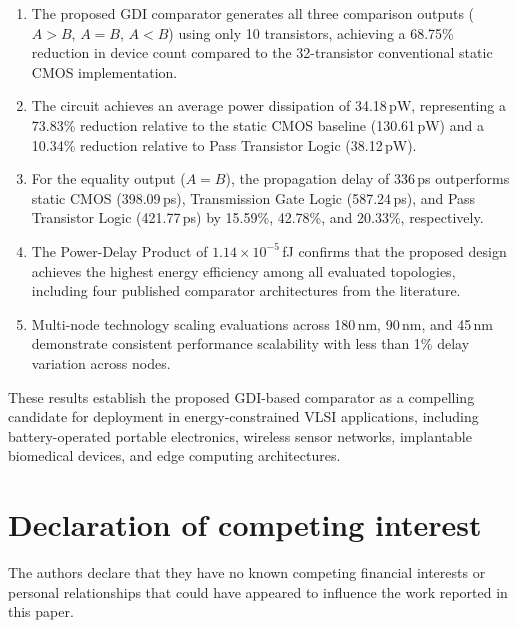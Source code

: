 \documentclass[final,5p,times,twocolumn]{elsarticle}
\begin{document}
\begin{enumerate}
    \item The proposed GDI comparator generates all three comparison outputs ($A>B$, $A=B$, $A<B$) using only 10 transistors, achieving a 68.75\% reduction in device count compared to the 32-transistor conventional static CMOS implementation.
    \item The circuit achieves an average power dissipation of 34.18\,pW, representing a 73.83\% reduction relative to the static CMOS baseline (130.61\,pW) and a 10.34\% reduction relative to Pass Transistor Logic (38.12\,pW).
    \item For the equality output ($A=B$), the propagation delay of 336\,ps outperforms static CMOS (398.09\,ps), Transmission Gate Logic (587.24\,ps), and Pass Transistor Logic (421.77\,ps) by 15.59\%, 42.78\%, and 20.33\%, respectively.
    \item The Power-Delay Product of $1.14 \times 10^{-5}$\,fJ confirms that the proposed design achieves the highest energy efficiency among all evaluated topologies, including four published comparator architectures from the literature.
    \item Multi-node technology scaling evaluations across 180\,nm, 90\,nm, and 45\,nm demonstrate consistent performance scalability with less than 1\% delay variation across nodes.
\end{enumerate}

These results establish the proposed GDI-based comparator as a compelling candidate for deployment in energy-constrained VLSI applications, including battery-operated portable electronics, wireless sensor networks, implantable biomedical devices, and edge computing architectures.


\section*{Declaration of competing interest}

The authors declare that they have no known competing financial interests or personal relationships that could have appeared to influence the work reported in this paper.

\end{document}
